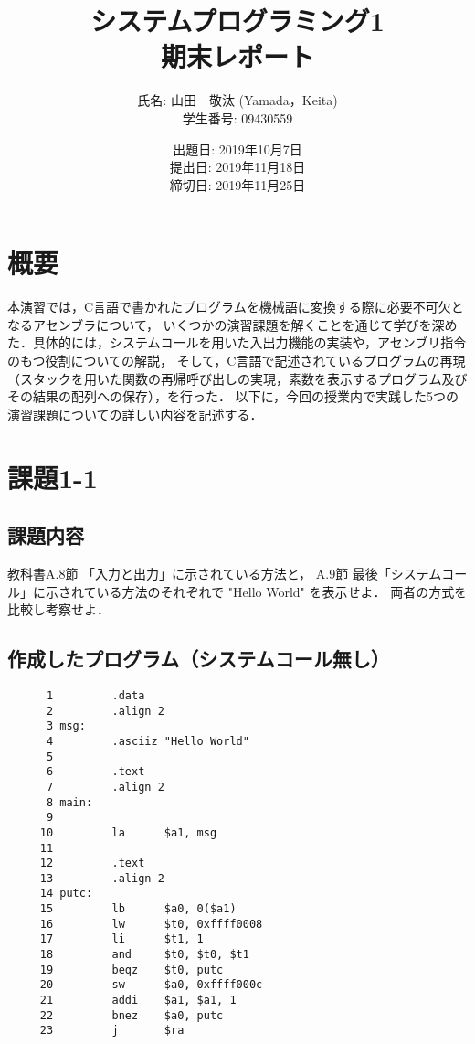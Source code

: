 \documentclass[a4j,11pt]{jarticle}
\title{システムプログラミング1 \\
       期末レポート}
\author{氏名: 山田　敬汰 (Yamada，Keita) \\
        学生番号: 09430559}
\date{出題日: 2019年10月7日 \\   %
      提出日: 2019年11月18日 \\
      締切日: 2019年11月25日 \\}  %
\begin{document}
\maketitle


\section{概要}

本演習では，C言語で書かれたプログラムを機械語に変換する際に必要不可欠となるアセンブラについて，
いくつかの演習課題を解くことを通じて学びを深めた．具体的には，システムコールを用いた入出力機能の実装や，アセンブリ指令のもつ役割についての解説，
そして，C言語で記述されているプログラムの再現（スタックを用いた関数の再帰呼び出しの実現，素数を表示するプログラム及びその結果の配列への保存），を行った．
以下に，今回の授業内で実践した5つの演習課題についての詳しい内容を記述する．

\section{課題1-1}

\subsection{課題内容}
教科書A.8節 「入力と出力」に示されている方法と， 
A.9節 最後「システムコール」に示されている方法のそれぞれで "Hello World" を表示せよ．
両者の方式を比較し考察せよ．

\subsection{作成したプログラム（システムコール無し）}

\begin{verbatim}
      1	        .data
      2	        .align 2
      3	msg:
      4	        .asciiz "Hello World"
      5	
      6	        .text
      7	        .align 2      
      8	main:
      9	        
     10	        la      $a1, msg
     11	        
     12	        .text
     13	        .align 2  
     14	putc:
     15	        lb      $a0, 0($a1)             
     16	        lw      $t0, 0xffff0008         
     17	        li      $t1, 1                 
     18	        and     $t0, $t0, $t1          
     19	        beqz    $t0, putc               
     20	        sw      $a0, 0xffff000c         
     21	        addi    $a1, $a1, 1
     22	        bnez    $a0, putc
     23	        j       $ra                     
 
\end{verbatim}
\end{document}
